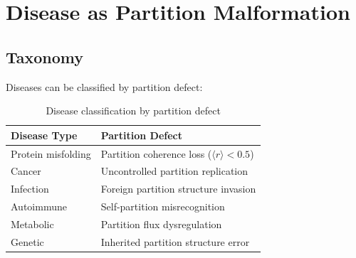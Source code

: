 ﻿\documentclass[twocolumn,10pt,a4paper]{article}
\theoremstyle{definition}
\theoremstyle{remark}
\newcommand{\Order}{\langle r \rangle}
\begin{document}
\section{Disease as Partition Malformation}
\label{sec:pathology}

\subsection{Taxonomy}

Diseases can be classified by partition defect:

\begin{table}[h]
\centering
\caption{Disease classification by partition defect}
\label{tab:disease}
\begin{tabular}{ll}
\toprule
Disease Type & Partition Defect \\
\midrule
Protein misfolding & Partition coherence loss ($\Order < 0.5$) \\
Cancer & Uncontrolled partition replication \\
Infection & Foreign partition structure invasion \\
Autoimmune & Self-partition misrecognition \\
Metabolic & Partition flux dysregulation \\
Genetic & Inherited partition structure error \\
\bottomrule
\end{tabular}
\end{table}
\end{document}
